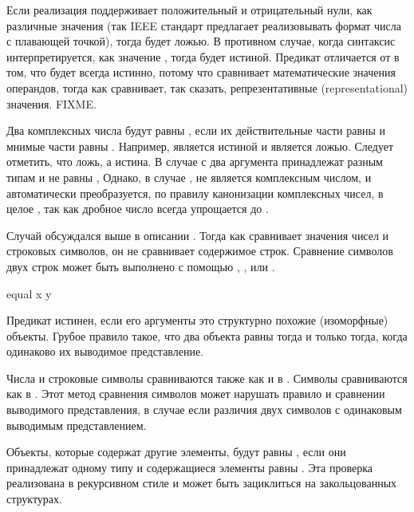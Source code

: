 \begin{defun}[Функция]
Если реализация поддерживает положительный и отрицательный нули, как различные
значения (так IEEE стандарт предлагает реализовывать формат числа с плавающей
точкой), тогда  будет ложью. В противном случае, когда
синтаксис  интерпретируется, как значение , тогда  будет истиной. Предикат \cdf{=} отличается от  в том, что
 будет всегда истинно, потому что \cdf{=} сравнивает
математические значения операндов, тогда как  сравнивает, так сказать,
репрезентативные (representational) значения. FIXME.

Два комплексных числа будут равны , если их действительные части равны
 и мнимые части равны .
Например,  является истиной и
 является ложью.
Следует отметить, что  ложь,
а  истина.
В случае с 
два аргумента принадлежат разным типам и не равны ,
Однако, в случае ,
 не является комплексным числом, и автоматически преобразуется, по
правилу канонизации комплексных чисел, в целое , так как дробное число
 всегда упрощается до .

Случай  обсуждался выше в описании . Тогда как
 сравнивает значения чисел и строковых символов, он не сравнивает
содержимое строк. Сравнение символов двух строк может быть выполнено с помощью
, ,  или .

\begin{defun}[Функция]
equal x y

Предикат  истинен, если его аргументы это структурно похожие
(изоморфные) объекты. Грубое правило такое, что два объекта равны 
тогда и только тогда, когда одинаково их выводимое представление.

Числа и строковые символы сравниваются также как и в .
Символы сравниваются как в . Этот метод сравнения символов может
нарушать правило и сравнении выводимого представления, в случае если различия
двух символов с одинаковым выводимым представлением.

Объекты, которые содержат другие элементы, будут равны , если они
принадлежат одному типу и содержащиеся элементы равны .
Эта проверка реализована в рекурсивном стиле и может быть зациклиться на
закольцованных структурах.


\end{defun}
\end{defun}
